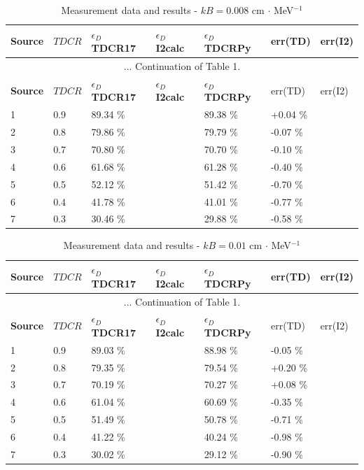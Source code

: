 \documentclass[12pt]{iopart}
\begin{document}
\begingroup
\footnotesize
\begin{longtable}[l]{| p{} | p{} |p{} |p{} |p{} |p{} |p{} |} 
\caption{Measurement data and results - $kB = 0.008$ cm $\cdot$ MeV$^{-1}$}
\label{Table1} \\ 
\hline
\textbf{Source} & \textbf{$TDCR$} & \textbf{$\epsilon_{D}$ TDCR17} & \textbf{$\epsilon_{D}$ I2calc} & \textbf{$\epsilon_{D}$ TDCRPy} & err(TD)& err(I2) \\
\endfirsthead
\multicolumn{7}{c}{... Continuation of Table 1.}\\ 
\hline
 \textbf{Source} & \textbf{$TDCR$} & \textbf{$\epsilon_{D}$ TDCR17} & \textbf{$\epsilon_{D}$ I2calc} & \textbf{$\epsilon_{D}$ TDCRPy} & err(TD)& err(I2) \\   \hline 
\endhead
\hline
 1 & 0.9   &   89.34 \% &  & 89.38 \% &  +0.04 \% & \\
 2 & 0.8   &   79.86 \% &  & 79.79 \% &  -0.07 \% & \\
 3 & 0.7   &   70.80 \% &  & 70.70 \% &  -0.10 \% & \\
 4 & 0.6   &   61.68 \% &  & 61.28 \% &  -0.40 \% & \\
 5 & 0.5   &   52.12 \% &  & 51.42 \% &  -0.70 \% & \\
 6 & 0.4   &   41.78 \% &  & 41.01 \% &  -0.77 \% & \\
 7 & 0.3   &   30.46 \% &  & 29.88 \% &  -0.58 \% & \\
\hline
\end{longtable} 
\endgroup


\begingroup
\footnotesize
\begin{longtable}[l]{| p{} | p{} |p{} | p{} |p{} |p{} |p{} |} 
\caption{Measurement data and results - $kB = 0.01$ cm $\cdot$ MeV$^{-1}$}
\label{Table1} \\ 
\hline
\textbf{Source} & \textbf{$TDCR$} & \textbf{$\epsilon_{D}$ TDCR17} & \textbf{$\epsilon_{D}$ I2calc} & \textbf{$\epsilon_{D}$ TDCRPy} & err(TD)& err(I2) \\ 
\endfirsthead
\multicolumn{7}{c}{... Continuation of Table 1.}\\ 
\hline
 \textbf{Source} & \textbf{$TDCR$} & \textbf{$\epsilon_{D}$ TDCR17} & \textbf{$\epsilon_{D}$ I2calc} & \textbf{$\epsilon_{D}$ TDCRPy} & err(TD)& err(I2) \\   \hline 
\endhead
\hline
 1 &  0.9  &  89.03 \% &  & 88.98 \% & -0.05 \% & \\
 2 &  0.8  &  79.35 \% &  & 79.54 \% & +0.20 \% & \\
 3 &  0.7  &  70.19 \% &  & 70.27 \% & +0.08 \% & \\
 4 &  0.6  &  61.04 \% &  & 60.69 \% & -0.35 \% & \\
 5 &  0.5  &  51.49 \% &  & 50.78 \% & -0.71 \% & \\
 6 &  0.4  &  41.22 \% &  & 40.24 \% & -0.98 \% & \\
 7 &  0.3  &  30.02 \% &  & 29.12 \% & -0.90 \% & \\
\hline
\end{longtable} 
\endgroup
\end{document}
